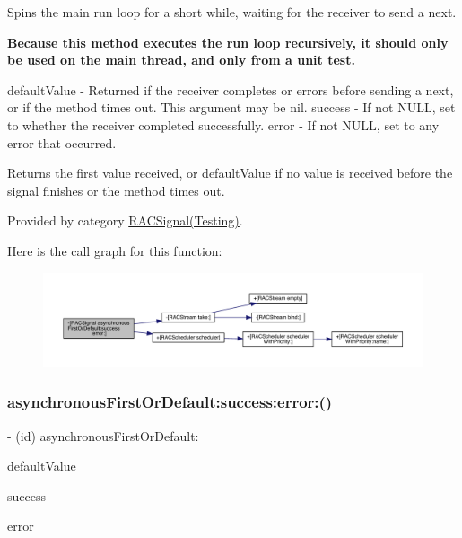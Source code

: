 Spins the main run loop for a short while, waiting for the receiver to send a {\ttfamily next}.

{\bfseries Because this method executes the run loop recursively, it should only be used on the main thread, and only from a unit test.}

default\+Value -\/ Returned if the receiver completes or errors before sending a {\ttfamily next}, or if the method times out. This argument may be nil. success -\/ If not N\+U\+LL, set to whether the receiver completed successfully. error -\/ If not N\+U\+LL, set to any error that occurred.

Returns the first value received, or {\ttfamily default\+Value} if no value is received before the signal finishes or the method times out. 

Provided by category \mbox{\hyperlink{category_r_a_c_signal_07_testing_08_a477114852c0e761a023a35e35ccc1784}{R\+A\+C\+Signal(\+Testing)}}.

Here is the call graph for this function\+:\nopagebreak
\begin{figure}[H]
\begin{center}
\leavevmode
\includegraphics[width=350pt]{interface_r_a_c_signal_a477114852c0e761a023a35e35ccc1784_cgraph}
\end{center}
\end{figure}
\mbox{\label{interface_r_a_c_signal_a477114852c0e761a023a35e35ccc1784}} 
\subsubsection{\texorpdfstring{asynchronous\+First\+Or\+Default\+:success\+:error\+:()}{asynchronousFirstOrDefault:success:error:()}\hspace{0.1cm}{\footnotesize\ttfamily [3/3]}}
{\footnotesize\ttfamily -\/ (id) asynchronous\+First\+Or\+Default\+: \begin{DoxyParamCaption}\item[{(id)}]{default\+Value }\item[{success:(B\+O\+OL $\ast$)}]{success }\item[{error:(N\+S\+Error $\ast$$\ast$)}]{error }\end{DoxyParamCaption}}

